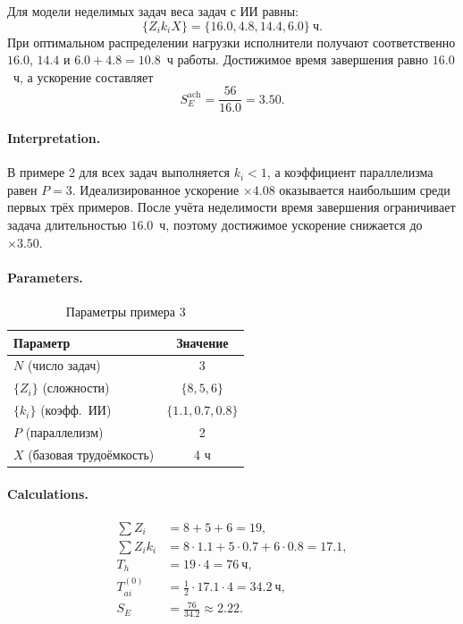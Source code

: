 \documentclass[12pt,a4paper]{article}
\theoremstyle{definition}
\begin{document}
Для модели неделимых задач веса задач с ИИ равны:
\[
  \{Z_i k_i X\} = \{16.0, 4.8, 14.4, 6.0\}~\text{ч}.
\]
При оптимальном распределении нагрузки исполнители получают соответственно $16.0$, $14.4$ и $6.0 + 4.8 = 10.8$~ч работы. Достижимое время завершения равно $16.0$~ч, а ускорение составляет
\[
  S_E^{\text{ach}} = \frac{56}{16.0} = 3.50.
\]

\paragraph{Interpretation.}
В примере 2 для всех задач выполняется $k_i<1$, а коэффициент параллелизма равен $P=3$. Идеализированное ускорение $\times 4.08$ оказывается наибольшим среди первых трёх примеров. После учёта неделимости время завершения ограничивает задача длительностью $16.0$~ч, поэтому достижимое ускорение снижается до $\times 3.50$.


\paragraph{Parameters.}
\begin{table}[ht!]
\centering
\caption{Параметры примера 3}
\label{tab:example-3-params}
\begin{tabular}{lc}
\toprule
Параметр & Значение \\
\midrule
$N$ (число задач) & 3 \\
$\{Z_i\}$ (сложности) & $\{8, 5, 6\}$ \\
$\{k_i\}$ (коэфф.\ ИИ) & $\{1.1, 0.7, 0.8\}$ \\
$P$ (параллелизм) & 2 \\
$X$ (базовая трудоёмкость) & 4 ч \\
\bottomrule
\end{tabular}
\end{table}

\paragraph{Calculations.}
\begin{align*}
  \sum Z_i &= 8 + 5 + 6 = 19, \\
  \sum Z_i k_i &= 8{\cdot}1.1 + 5{\cdot}0.7 + 6{\cdot}0.8 = 17.1, \\
  T_h &= 19 \cdot 4 = 76~\text{ч}, \\
  T_{ai}^{(0)} &= \frac{1}{2} \cdot 17.1 \cdot 4 = 34.2~\text{ч}, \\
  S_E &= \frac{76}{34.2} \approx 2.22.
\end{align*}
\end{document}
